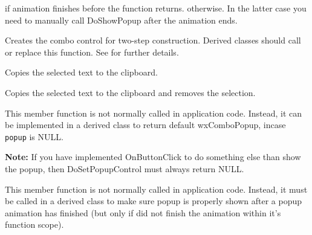\true if animation finishes before the function returns.
\false otherwise. In the latter case you need to manually call DoShowPopup
after the animation ends.


\label{wxcomboctrlcreate}


Creates the combo control for two-step construction. Derived classes
should call or replace this function. See \rtfsp
for further details.


\label{wxcomboctrlcopy}


Copies the selected text to the clipboard.


\label{wxcomboctrlcut}


Copies the selected text to the clipboard and removes the selection.


\label{wxcomboctrldosetpopupcontrol}


This member function is not normally called in application code.
Instead, it can be implemented in a derived class to return
default wxComboPopup, incase {\tt popup} is NULL.

\textbf{Note:} If you have implemented OnButtonClick to do
something else than show the popup, then DoSetPopupControl
must always return NULL.


\label{wxcomboctrldoshowpopup}


This member function is not normally called in application code.
Instead, it must be called in a derived class to make sure popup
is properly shown after a popup animation has finished (but only
if  did not finish
the animation within it's function scope).

